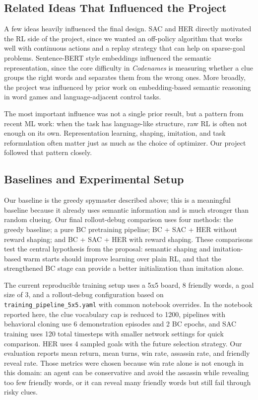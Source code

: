 \documentclass[9pt]{article}
\begin{document}
\subsection{Related Ideas That Influenced the
Project}\label{related-ideas-that-influenced-the-project}

A few ideas heavily influenced the final design. SAC and HER
directly motivated the RL side of the project, since we wanted an
off-policy algorithm that works well with continuous actions and a
replay strategy that can help on sparse-goal problems. Sentence-BERT
style embeddings influenced the semantic representation, since the core
difficulty in \emph{Codenames} is measuring whether a clue groups the right
words and separates them from the wrong ones. More broadly, the project
was influenced by prior work on embedding-based semantic reasoning in
word games and language-adjacent control tasks.

The most important influence was not a single prior result, but a
pattern from recent ML work: when the task has language-like structure,
raw RL is often not enough on its own. Representation learning, shaping,
imitation, and task reformulation often matter just as much as the
choice of optimizer. Our project followed that pattern closely.


\subsection{Baselines and Experimental
Setup}\label{baselines-and-experimental-setup}

Our baseline is the greedy spymaster described above; this is a
meaningful baseline because it already uses semantic information and is
much stronger than random clueing. Our final rollout-debug comparison
uses four methods: the greedy baseline; a pure BC pretraining pipeline;
BC + SAC + HER without reward shaping; and BC + SAC + HER with reward
shaping. These comparisons test the central hypothesis from the
proposal: semantic shaping and imitation-based warm starts should
improve learning over plain RL, and that the strengthened BC stage can
provide a better initialization than imitation alone.

The current reproducible training setup uses a 5x5 board, 8 friendly
words, a goal size of 3, and a rollout-debug configuration based on
\texttt{training\_pipeline\_5x5.yaml} with common notebook overrides.
In the notebook reported here, the clue vocabulary cap is reduced to
1200, pipelines with behavioral cloning use 6 demonstration episodes
and 2 BC epochs, and SAC training uses 120 total timesteps with smaller
network settings for quick comparison. HER uses 4 sampled goals with the
future selection strategy. Our evaluation reports mean return, mean
turns, win rate,
assassin rate, and friendly reveal rate. Those metrics were chosen
because win rate alone is not enough in this domain: an agent can be
conservative and avoid the assassin while revealing too few friendly
words, or it can reveal many friendly words but still fail through risky
clues.
\end{document}
